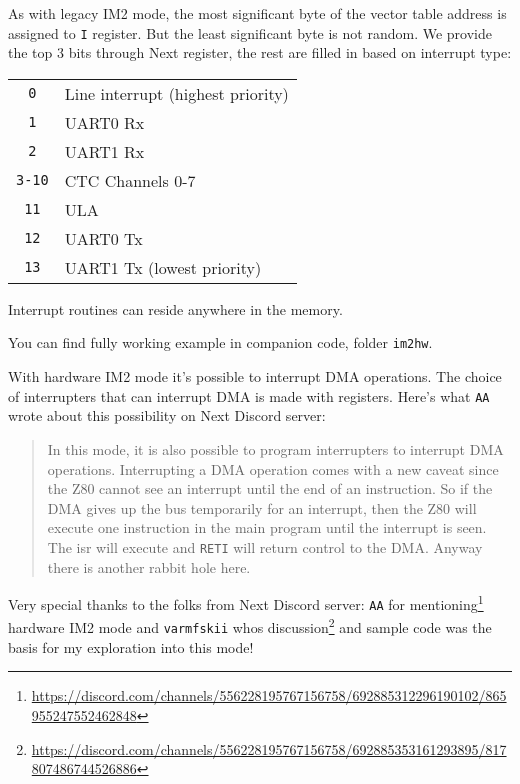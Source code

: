 As with legacy IM2 mode, the most significant byte of the vector table address is assigned to {\tt I} register. But the least significant byte is not random. We provide the top 3 bits through  Next register, the rest are filled in based on interrupt type:

\begin{tabular}{cl}
	{\tt 0} & Line interrupt (highest priority) \\
	{\tt 1} & UART0 Rx \\
	{\tt 2} & UART1 Rx \\
	{\tt 3-10} & CTC Channels 0-7 \\
	{\tt 11} & ULA \\
	{\tt 12} & UART0 Tx \\
	{\tt 13} & UART1 Tx (lowest priority) \\
\end{tabular}

Interrupt routines can reside anywhere in the memory.

You can find fully working example in companion code, folder {\tt im2hw}.

With hardware IM2 mode it's possible to interrupt DMA operations. The choice of interrupters that can interrupt DMA is made with  registers. Here's what {\tt AA} wrote about this possibility on Next Discord server:

\vspace*{-1ex}
\begin{quote}
	In this mode, it is also possible to program interrupters to interrupt DMA operations. Interrupting a DMA operation comes with a new caveat since the Z80 cannot see an interrupt until the end of an instruction. So if the DMA gives up the bus temporarily for an interrupt, then the Z80 will execute one instruction in the main program until the interrupt is seen. The isr will execute and {\tt RETI} will return control to the DMA. Anyway there is another rabbit hole here.
\end{quote}

Very special thanks to the folks from Next Discord server: {\tt AA} for mentioning\footnote{\url{https://discord.com/channels/556228195767156758/692885312296190102/865955247552462848}} hardware IM2 mode and {\tt varmfskii} whos discussion\footnote{\url{https://discord.com/channels/556228195767156758/692885353161293895/817807486744526886}} and sample code was the basis for my exploration into this mode!



